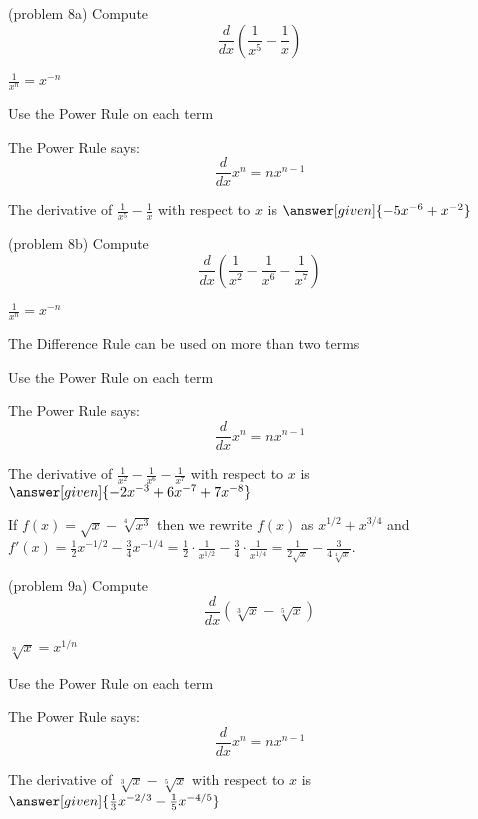 \documentclass{ximera}
\begin{document}
\begin{problem}(problem 8a)
  Compute 
  \[
  \frac{d}{dx} \left(\frac{1}{x^5} - \frac{1}{x}\right)
  \]
  
    \begin{hint}
		 $\frac{1}{x^n} = x^{-n}$
		\end{hint}
		\begin{hint}
      Use the Power Rule on each term
    \end{hint}
    \begin{hint}
      The Power Rule says:
      \[
      \frac{d}{dx} x^n = nx^{n-1}
      \]
    \end{hint}    
		The derivative of $\frac{1}{x^5} - \frac{1}{x}$ with respect to $x$ is
		 $\answer[given]{-5x^{-6} + x^{-2}}$
	
\end{problem}


\begin{problem}(problem 8b)
  Compute 
  \[
  \frac{d}{dx} \left(\frac{1}{x^2} - \frac{1}{x^6} - \frac{1}{x^7}\right)
  \]
  
    \begin{hint}
		 $\frac{1}{x^n} = x^{-n}$
		\end{hint}
		\begin{hint}
		  The Difference Rule can be used on more than two terms
		\end{hint}
		\begin{hint}
      Use the Power Rule on each term
    \end{hint}
    \begin{hint}
      The Power Rule says:
      \[
      \frac{d}{dx} x^n = nx^{n-1}
      \]
    \end{hint}    
		The derivative of $\frac{1}{x^2} - \frac{1}{x^6} - \frac{1}{x^7}$ with respect to $x$ is
		 $\answer[given]{-2x^{-3} + 6x^{-7} + 7x^{-8}}$
	
\end{problem}


\begin{example}[example 9]
 If $f(x) = \sqrt x - \sqrt[4] {x^3}$ then we rewrite $f(x)$ as $x^{1/2} + x^{3/4}$ and
$f'(x) = \tfrac12 x^{-1/2} - \tfrac34 x^{-1/4} = \tfrac12 \cdot \frac{1}{x^{1/2}} - \tfrac34 \cdot \frac{1}{x^{1/4}} 
= \frac{1}{2\sqrt x} - \frac{3}{4\sqrt[4] x}$.
\end{example}


\begin{problem}(problem 9a)
  Compute 
  \[
  \frac{d}{dx} \left(\sqrt[3] x - \sqrt[5] x\right)
  \]
  
    \begin{hint}
		 $\sqrt[n] x = x^{1/n}$
		\end{hint}
		\begin{hint}
      Use the Power Rule on each term
    \end{hint}
    \begin{hint}
      The Power Rule says:
      \[
      \frac{d}{dx} x^n = nx^{n-1}
      \]
    \end{hint}    
		The derivative of $\sqrt[3] x - \sqrt[5] x$ with respect to $x$ is
		 $\answer[given]{\frac13 x^{-2/3} - \frac15 x^{-4/5}}$
	
\end{problem}
\end{document}
